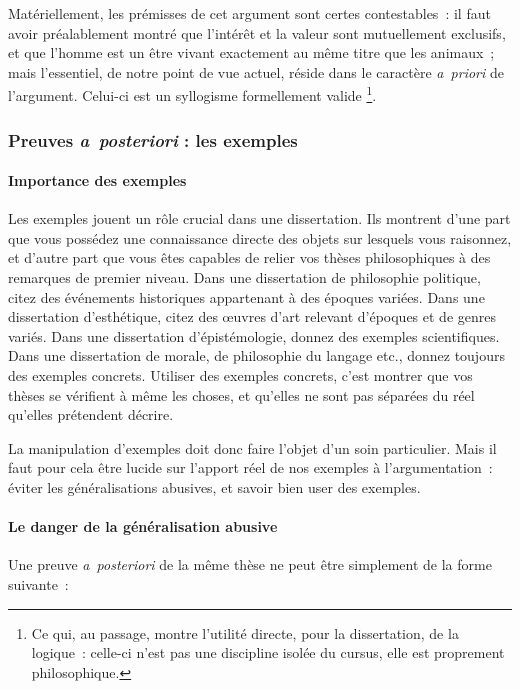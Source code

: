 \documentclass[a4paper]{article}
\begin{document}
Matériellement, les prémisses de cet argument sont certes contestables :
il faut avoir préalablement montré que l'intérêt et la valeur sont
mutuellement exclusifs, et que l'homme est un être vivant exactement au
même titre que les animaux ; mais l'essentiel, de notre point de vue
actuel, réside dans le caractère \emph{a priori} de l'argument. Celui-ci est
un syllogisme formellement valide \footnote{Ce qui, au passage, montre l'utilité directe, pour la dissertation,
    de la logique : celle-ci n'est pas une discipline isolée du cursus,
    elle est proprement philosophique.
 }.
\subsubsection{Preuves \emph{a posteriori} : les exemples}
\label{sec-3-3-2}
\paragraph{Importance des exemples}
\label{sec-3-3-2-1}


Les exemples jouent un rôle crucial dans une dissertation. Ils montrent
d'une part que vous possédez une connaissance directe des objets sur
lesquels vous raisonnez, et d'autre part que vous êtes capables de
relier vos thèses philosophiques à des remarques de premier niveau. Dans
une dissertation de philosophie politique, citez des événements
historiques appartenant à des époques variées. Dans une dissertation
d'esthétique, citez des œuvres d'art relevant d'époques et de genres
variés. Dans une dissertation d'épistémologie, donnez des exemples
scientifiques. Dans une dissertation de morale, de philosophie du
langage etc., donnez toujours des exemples concrets. Utiliser des
exemples concrets, c'est montrer que vos thèses se vérifient à même les
choses, et qu'elles ne sont pas séparées du réel qu'elles prétendent
décrire.

La manipulation d'exemples doit donc faire l'objet d'un soin
particulier. Mais il faut pour cela être lucide sur l'apport réel de nos
exemples à l'argumentation : éviter les généralisations abusives, et
savoir bien user des exemples.
\paragraph{Le danger de la généralisation abusive}
\label{sec-3-3-2-2}

   
   Une preuve \emph{a posteriori} de la même thèse ne peut être simplement de la
   forme suivante :
   
\end{document}
